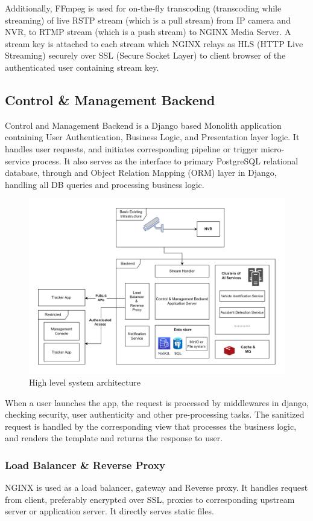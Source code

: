 Additionally, FFmpeg is used for on-the-fly transcoding (transcoding while streaming) of live RSTP stream (which is a pull stream) from IP camera and NVR, to RTMP stream (which is a push stream) to NGINX Media Server. A stream key is attached to each stream which NGINX relays as HLS (HTTP Live Streaming) securely over SSL (Secure Socket Layer) to client browser of the authenticated user containing stream key.   

\subsection{Control \& Management Backend}
Control and Management Backend is a Django based Monolith application containing User Authentication, Business Logic, and Presentation layer logic. It handles user requests, and initiates corresponding pipeline or trigger micro-service process. It also serves as the interface to primary PostgreSQL relational database, through and Object Relation Mapping (ORM) layer in Django, handling all DB queries and processing business logic.

\begin{figure}[!ht]
	\centering
	\includegraphics[width=0.8\linewidth]{Images/architecture_high_level}
	\caption{High level system architecture}
	\label{fig:architecturehighlevel}
\end{figure}

When a user launches the app, the request is processed by middlewares in django, checking security, user authenticity and other pre-processing tasks. The sanitized request is handled by the corresponding view that processes the business logic, and renders the template and returns the response to user.

\subsubsection{Load Balancer \& Reverse Proxy}
NGINX is used as a load balancer, gateway and Reverse proxy. It handles request from client, preferably encrypted over SSL, proxies to corresponding upstream server or application server. It directly serves static files.

